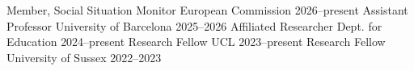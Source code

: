 
\begin{cvhonors}
  \cvhonor
    {Member, Social Situation Monitor} %
    {} %
    {European Commission} %
    {2026--present} %
  \cvhonor
    {Assistant Professor} %
    {} %
    {University of Barcelona} %
    {2025--2026} %
  \cvhonor
    {Affiliated Researcher} %
    {} %
    {Dept. for Education} %
    {2024--present} %
  \cvhonor
    {Research Fellow} %
    {} %
    {UCL} %
    {2023--present} %
  \cvhonor
    {Research Fellow} %
    {} %
    {University of Sussex} %
    {2022--2023} %
\end{cvhonors}